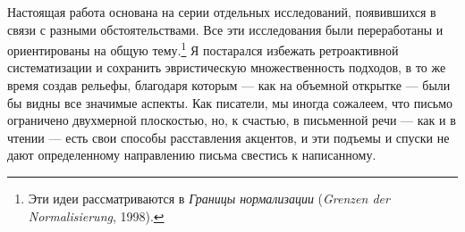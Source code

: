 \documentclass[12pt]{book}
\begin{document}
Настоящая работа основана на серии отдельных исследований, появившихся в связи с разными обстоятельствами. Все эти исследования были переработаны и ориентированы на общую тему.\footnote{Эти идеи рассматриваются в \textit{Границы нормализации} (\textit{Grenzen der Normalisierung}, 1998).} Я постарался избежать ретроактивной систематизации и сохранить эвристическую множественность подходов, в то же время создав рельефы, благодаря которым --- как на объемной открытке --- были бы видны все значимые аспекты. Как писатели, мы иногда сожалеем, что письмо ограничено двухмерной плоскостью, но, к счастью, в письменной речи --- как и в чтении --- есть свои способы расставления акцентов, и эти подъемы и спуски не дают определенному направлению письма свестись к написанному.
\end{document}
